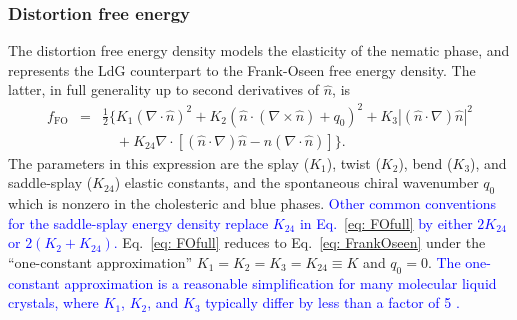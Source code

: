 \documentclass[utf8]{frontiersFPHY} %
\newcommand{\DAB}[1]{\textcolor{blue}{#1}}
\begin{document}
\subsubsection{Distortion free energy}
The distortion free energy density models the elasticity of the nematic phase, and represents the LdG counterpart to the Frank-Oseen free energy density. The latter, in full generality up to second derivatives of $\hat n$, is 
\begin{eqnarray} 
f_{\mathrm{FO}} &=& \frac{1}{2} \bigl\{K_1(\nabla  \cdot \hat n)^2 + K_2 (\hat n \cdot (\nabla \times \hat n) +  q_0)^2 + K_3  |(\hat n \cdot \nabla )\hat n |^2   \nonumber   \\
& & \quad  + K_{24} \nabla \cdot [ (\hat n \cdot \nabla) \hat n  - \hat n (\nabla \cdot \hat n ) ] \bigr\}.  \label{eq: FOfull}
\end{eqnarray}
The parameters in this expression are the splay ($K_1$), twist ($K_2$), bend ($K_3$), and saddle-splay ($K_{24}$) elastic constants, and the spontaneous chiral wavenumber $q_0$ which is nonzero in the cholesteric and blue phases. \DAB{Other common  conventions for the saddle-splay energy density replace $K_{24}$ in Eq.~\ref{eq: FOfull} by either $2K_{24}$ or $2(K_2+K_{24})$.} Eq.~\ref{eq: FOfull} reduces to Eq.~\ref{eq: FrankOseen} under the ``one-constant approximation'' $K_1 = K_2 = K_3 = K_{24} \equiv K $ and $q_0=0$.  \DAB{The one-constant approximation is a reasonable simplification for  many molecular liquid crystals, where $K_1$, $K_2$, and $K_3$ typically differ by less than a factor of 5  \cite{deJeu1976Determination,Madhusudana1982Elasticity}.}
\end{document}
